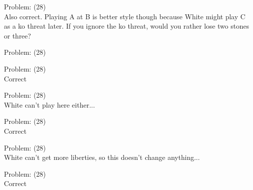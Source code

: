 \documentclass[11pt]{article}
\begin{document}
\begin{minipage}[t]{0.5\textwidth}
  {\centering
  
Problem: (28)\\
Also correct. Playing A at B is better style though because White might play C as a ko threat later. If you ignore the ko threat, would you rather lose two stones or three?\\
  }
\end{minipage}
\begin{minipage}[t]{0.5\textwidth}
  {\centering
  
Problem: (28)\\
  }
\end{minipage}
\begin{minipage}[t]{0.5\textwidth}
  {\centering
  
Problem: (28)\\
Correct\\
  }
\end{minipage}
\begin{minipage}[t]{0.5\textwidth}
  {\centering
  
Problem: (28)\\
White can't play here either...\\
  }
\end{minipage}
\begin{minipage}[t]{0.5\textwidth}
  {\centering
  
Problem: (28)\\
Correct\\
  }
\end{minipage}
\begin{minipage}[t]{0.5\textwidth}
  {\centering
  
Problem: (28)\\
White can't get more liberties, so this doesn't change anything...\\
  }
\end{minipage}
\begin{minipage}[t]{0.5\textwidth}
  {\centering
  
Problem: (28)\\
Correct\\
  }
\end{minipage}
\end{document}
